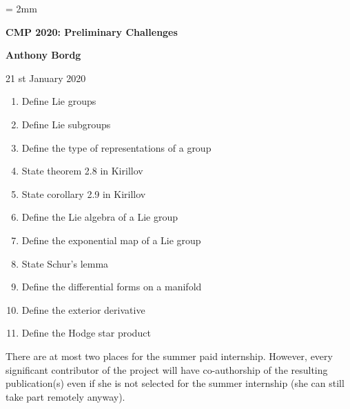 \documentclass[12pt]{article}
\begin{document}
%
\parskip = 2mm
\begin{center}
{\bf\Large CMP 2020: Preliminary Challenges}

\vspace{3mm}

{\large\bf Anthony Bordg}
\vspace {3mm}

{21 st January 2020}  
\end{center}

\begin{enumerate}
	\item Define Lie groups	
	\item Define Lie subgroups
	\item Define the type of representations of a group
	\item State theorem 2.8 in Kirillov
	\item State corollary 2.9 in Kirillov
	\item Define the Lie algebra of a Lie group
	\item Define the exponential map of a Lie group
	\item State Schur's lemma
	\item Define the differential forms on a manifold
	\item Define the exterior derivative
	\item Define the Hodge star product
\end{enumerate}

There are at most two places for the summer paid internship. However, every significant contributor of the project will have co-authorship of the resulting publication(s) even if she is not selected for the summer internship (she can still take part remotely anyway).
\end{document}
